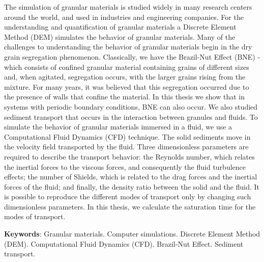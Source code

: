 
\begin{resumo}[Abstract]
    The simulation of granular materials is studied widely in many research centers around the world, and used in industries and engineering companies. For the understanding and quantification of granular materials a Discrete Element Method (DEM) simulates the behavior of granular materials.
    Many of the challenges to understanding the behavior of granular materials begin in the dry grain segregation phenomenon. Classically, we have the Brazil-Nut Effect (BNE) - which consists of confined granular material containing grains of different sizes and, when agitated, segregation occurs, with the larger grains rising from the mixture. For many years, it was believed that this segregation occurred due to the presence of walls that confine the material. In this thesis we show that in systems with periodic boundary conditions, BNE can also occur.
    We also studied sediment transport that occurs in the interaction between granules and fluids. To simulate the behavior of granular materials immersed in a fluid, we use a Computational Fluid Dynamics (CFD) technique. The solid sediments move in the velocity field transported by the fluid. Three dimensionless parameters are required to describe the transport behavior: the Reynolds number, which relates the inertial forces to the viscous forces, and consequently the fluid turbulence effects; the number of Shields, which is related to the drag forces and the inertial forces of the fluid; and finally, the density ratio between the solid and the fluid. It is possible to reproduce the different modes of transport only by changing such dimensionless parameters. In this thesis, we calculate the saturation time for the modes of transport.

    \textbf{Keywords}: Granular materials. Computer simulations. Discrete Element Method (DEM). Computational Fluid Dynamics (CFD). Brazil-Nut Effect. Sediment transport.
\end{resumo}

